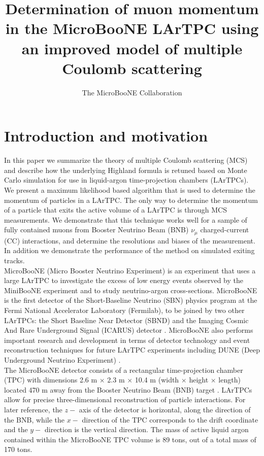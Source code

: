 \documentclass[a4paper,11pt]{article}
\author{The MicroBooNE Collaboration}
\title{Determination of muon momentum in the MicroBooNE LArTPC using an improved model of multiple Coulomb scattering}
\begin{document}
\maketitle
\flushbottom

\section{Introduction and motivation}\label{sec:intro}

In this paper we summarize the theory of multiple Coulomb scattering (MCS) and describe how the underlying Highland formula is retuned based on Monte Carlo simulation for use in liquid-argon time-projection chambers (LArTPCs). We present a maximum likelihood based algorithm that is used to determine the momentum of particles in a LArTPC. The only way to determine the momentum of a particle that exits the active volume of a LArTPC is through MCS measurements. We demonstrate that this technique works well for a sample of fully contained muons from Booster Neutrino Beam (BNB) $\nu_\mu$ charged-current (CC) interactions, and determine the resolutions and biases of the measurement. In addition we demonstrate the performance of the method on simulated exiting tracks.\\

MicroBooNE (Micro Booster Neutrino Experiment) is an experiment that uses a large LArTPC to investigate the excess of low energy events observed by the MiniBooNE experiment \cite{Aguilar-Arevalo:2013pmq} and to study neutrino-argon cross-sections. MicroBooNE is the first detector of the Short-Baseline Neutrino (SBN) \cite{SBNwhitepaper} physics program at the Fermi National Accelerator Laboratory (Fermilab), to be joined by two other LArTPCs: the Short Baseline Near Detector (SBND) and the Imaging Cosmic And Rare Underground Signal (ICARUS) detector \cite{ICARUS_maincitation}. MicroBooNE also performs important research and development in terms of detector technology and event reconstruction techniques for future LArTPC experiments including DUNE (Deep Underground Neutrino Experiment) \cite{DUNE_citation}.\\



The MicroBooNE detector \cite{ub_detectorpaper} consists of a rectangular time-projection chamber (TPC) with dimensions 2.6 m $\times$ 2.3 m $\times$ 10.4 m (width $\times$ height $\times$ length) located 470 m away from the Booster Neutrino Beam (BNB) target \cite{BNB_citation}. LArTPCs allow for precise three-dimensional reconstruction of particle interactions. For later reference, the $z-$ axis of the detector is horizontal, along the direction of the BNB, while the $x-$ direction of the TPC corresponds to the drift coordinate and the $y-$ direction is the vertical direction. The mass of active liquid argon contained within the MicroBooNE TPC volume is 89 tons, out of a total mass of 170 tons.\\
\end{document}
